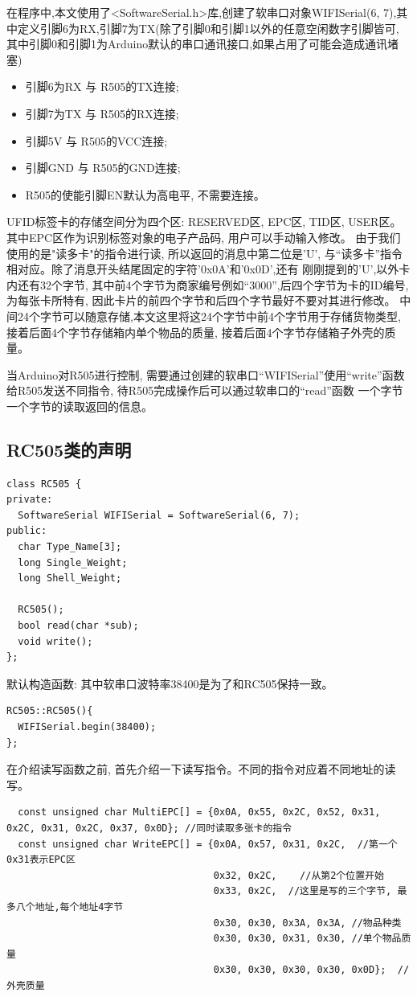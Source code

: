 \documentclass{article}
\begin{document}
在程序中,本文使用了<SoftwareSerial.h>库,创建了软串口对象WIFISerial(6, 7),其中定义引脚6为RX,引脚7为TX(除了引脚0和引脚1以外的任意空闲数字引脚皆可,
其中引脚0和引脚1为Arduino默认的串口通讯接口,如果占用了可能会造成通讯堵塞) \\
\begin{itemize}
    \item 引脚6为RX 与 R505的TX连接;
    \item 引脚7为TX 与 R505的RX连接;
    \item 引脚5V 与 R505的VCC连接;
    \item 引脚GND 与 R505的GND连接;
    \item R505的使能引脚EN默认为高电平, 不需要连接。
\end{itemize}

UFID标签卡的存储空间分为四个区: RESERVED区, EPC区, TID区, USER区。其中EPC区作为识别标签对象的电子产品码, 用户可以手动输入修改。
由于我们使用的是"读多卡"的指令进行读, 所以返回的消息中第二位是'U', 与“读多卡”指令相对应。除了消息开头结尾固定的字符'0x0A'和'0x0D',还有
刚刚提到的'U',以外卡内还有32个字节, 其中前4个字节为商家编号例如“3000”,后四个字节为卡的ID编号,为每张卡所特有,
因此卡片的前四个字节和后四个字节最好不要对其进行修改。
中间24个字节可以随意存储,本文这里将这24个字节中前4个字节用于存储货物类型, 接着后面4个字节存储箱内单个物品的质量, 接着后面4个字节存储箱子外壳的质量。

当Arduino对R505进行控制, 需要通过创建的软串口“WIFISerial”使用“write”函数给R505发送不同指令, 待R505完成操作后可以通过软串口的“read”函数
一个字节一个字节的读取返回的信息。

\subsection{RC505类的声明}

\begin{lstlisting}
class RC505 {
private:
  SoftwareSerial WIFISerial = SoftwareSerial(6, 7);
public:
  char Type_Name[3];  
  long Single_Weight;
  long Shell_Weight;
  
  RC505();
  bool read(char *sub);
  void write();
};
\end{lstlisting}

默认构造函数: 其中软串口波特率38400是为了和RC505保持一致。
\begin{lstlisting}
RC505::RC505(){
  WIFISerial.begin(38400);
};	
\end{lstlisting}

在介绍读写函数之前, 首先介绍一下读写指令。不同的指令对应着不同地址的读写。
\begin{lstlisting}
  const unsigned char MultiEPC[] = {0x0A, 0x55, 0x2C, 0x52, 0x31, 0x2C, 0x31, 0x2C, 0x37, 0x0D}; //同时读取多张卡的指令
  const unsigned char WriteEPC[] = {0x0A, 0x57, 0x31, 0x2C,  //第一个0x31表示EPC区
                                    0x32, 0x2C,    //从第2个位置开始
                                    0x33, 0x2C,  //这里是写的三个字节, 最多八个地址,每个地址4字节
                                    0x30, 0x30, 0x3A, 0x3A, //物品种类
                                    0x30, 0x30, 0x31, 0x30, //单个物品质量
                                    0x30, 0x30, 0x30, 0x30, 0x0D};  //外壳质量  
\end{lstlisting}
\end{document}
